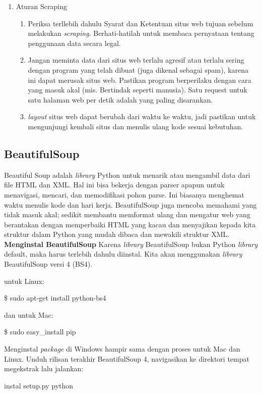 \begin{enumerate}
\item{Aturan Scraping}
\begin{enumerate}
\item Periksa terllebih dahulu Syarat dan Ketentuan situs web tujuan sebelum melakukan \textit{scraping}. Berhati-hatilah untuk membaca pernyataan tentang penggunaan data secara legal. 
\item Jangan meminta data dari situs web terlalu agresif atau terlalu sering dengan program yang telah dibuat (juga dikenal sebagai spam), karena ini dapat merusak situs web. Pastikan program berperilaku dengan cara yang masuk akal (mis. Bertindak seperti manusia). Satu request untuk satu halaman web per detik adalah yang paling disarankan.
\item \textit{layout} situs web dapat berubah dari waktu ke waktu, jadi pastikan untuk mengunjungi kembali situs dan menulis ulang kode sesuai kebutuhan.
\end{enumerate}
\end{enumerate}

\subsection{BeautifulSoup}
\par Beautiful Soup adalah \textit{library} Python untuk menarik atau mengambil data dari file HTML dan XML. Hal ini bisa bekerja dengan parser apapun untuk menavigasi, mencari, dan memodifikasi pohon parse. Ini biasanya menghemat waktu menulis kode dan hari kerja. BeautifulSoup juga mencoba memahami yang tidak masuk akal; sedikit membantu memformat ulang dan mengatur web yang berantakan dengan memperbaiki HTML yang kacau dan menyajikan kepada kita struktur dalam Python yang mudah dibaca dan mewakili struktur XML.
\textbf{Menginstal BeautifulSoup}
Karena \textit{library} BeautifulSoup bukan Python \textit{library} default, maka harus terlebih dahulu diinstal. Kita akan menggunakan \textit{library} BeautifulSoup versi 4 (BS4).

untuk Linux:

\$ sudo apt-get install python-bs4

dan untuk Mac:

\$ sudo easy\_install pip

Menginstal \textit{package} di Windows hampir sama dengan proses untuk Mac dan Linux. Unduh rilisan terakhir BeautifulSoup 4, navigasikan ke direktori tempat megekstrak lalu jalankan:

instal setup.py python

